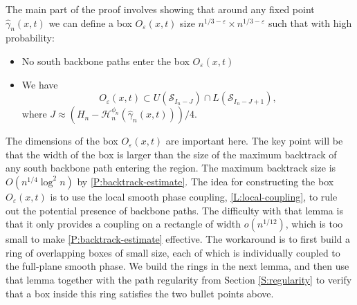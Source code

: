 \documentclass[11pt,twoside]{amsart}
\theoremstyle{plain}
\numberwithin{quest}{section}
\theoremstyle{remark}
\numberwithin{rem}{section}
\theoremstyle{definition}
\newcommand{\eps}{\varepsilon}
\newcommand{\cS}{\mathcal{S}}
\newcommand{\cH}{\mathcal{H}}
\begin{document}
	The main part of the proof involves showing that around any fixed point $\hat \gamma_n(x, t)$ we can define a box $O_\eps(x, t)$ size $n^{1/3 - \eps} \times n^{1/3-\eps}$ such that with high probability:
	\begin{itemize}[nosep]
		\item No south backbone paths enter the box $O_\eps(x, t)$
		\item We have
		\begin{equation}
		\label{E:O-containment}
		O_\eps(x, t) \subset U(\cS_{I_n-J}) \cap L(\cS_{I_n - J+1}),
		\end{equation}
		where 
		$
		J \approx (H_n - \cH_n^{\phi_n}(\hat \gamma_n(x, t)))/4.
		$
	\end{itemize}
	The dimensions of the box $O_\eps(x, t)$ are important here. The key point will be that the width of the box is larger than the size of the maximum backtrack of any south backbone path entering the region. The maximum backtrack size is $O(n^{1/4}\log^2 n)$ by \cref{P:backtrack-estimate}. The idea for constructing the box $O_\eps(x, t)$ is to use the local smooth phase coupling, \cref{L:local-coupling}, to rule out the potential presence of backbone paths. The difficulty with that lemma is that it only provides a coupling on a rectangle of width $o(n^{1/12})$, which is too small to make \cref{P:backtrack-estimate} effective. The workaround is to first build a ring of overlapping boxes of small size, each of which is individually coupled to the full-plane smooth phase. We build the rings in the next lemma, and then use that lemma together with the path regularity from Section \ref{S:regularity} to verify that a box inside this ring satisfies the two bullet points above.
	
\end{document}
